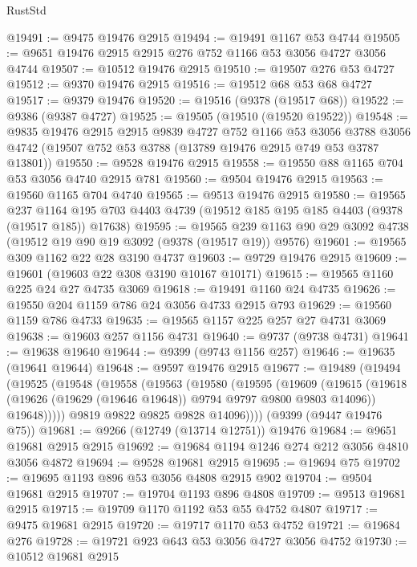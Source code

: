 \begin{lexlean}{RustStd}
\begin{coremodule}
@19491 := @9475 @19476 @2915
@19494 := @19491 @1167 @53 @4744
@19505 := @9651 @19476 @2915 @2915 @276 @752 @1166 @53 @3056 @4727 @3056 @4744
@19507 := @10512 @19476 @2915
@19510 := @19507 @276 @53 @4727
@19512 := @9370 @19476 @2915
@19516 := @19512 @68 @53 @68 @4727
@19517 := @9379 @19476
@19520 := @19516 (@9378 (@19517 @68))
@19522 := @9386 (@9387 @4727)
@19525 := @19505 (@19510 (@19520 @19522))
@19548 := @9835
    @19476
    @2915
    @2915
    @9839
    @4727
    @752
    @1166
    @53
    @3056
    @3788
    @3056
    @4742
    (@19507 @752 @53 @3788 (@13789 @19476 @2915 @749 @53 @3787 @13801))
@19550 := @9528 @19476 @2915
@19558 := @19550 @88 @1165 @704 @53 @3056 @4740 @2915 @781
@19560 := @9504 @19476 @2915
@19563 := @19560 @1165 @704 @4740
@19565 := @9513 @19476 @2915
@19580 := @19565
    @237
    @1164
    @195
    @703
    @4403
    @4739
    (@19512 @185 @195 @185 @4403 (@9378 (@19517 @185)) @17638)
@19595 := @19565
    @239
    @1163
    @90
    @29
    @3092
    @4738
    (@19512 @19 @90 @19 @3092 (@9378 (@19517 @19)) @9576)
@19601 := @19565 @309 @1162 @22 @28 @3190 @4737
@19603 := @9729 @19476 @2915
@19609 := @19601 (@19603 @22 @308 @3190 @10167 @10171)
@19615 := @19565 @1160 @225 @24 @27 @4735 @3069
@19618 := @19491 @1160 @24 @4735
@19626 := @19550 @204 @1159 @786 @24 @3056 @4733 @2915 @793
@19629 := @19560 @1159 @786 @4733
@19635 := @19565 @1157 @225 @257 @27 @4731 @3069
@19638 := @19603 @257 @1156 @4731
@19640 := @9737 (@9738 @4731)
@19641 := @19638 @19640
@19644 := @9399 (@9743 @1156 @257)
@19646 := @19635 (@19641 @19644)
@19648 := @9597 @19476 @2915
@19677 := @19489
    (@19494
      (@19525
        (@19548
          (@19558
            (@19563
              (@19580
                (@19595
                  (@19609
                    (@19615
                      (@19618 (@19626 (@19629 (@19646 @19648)) @9794 @9797 @9800 @9803 @14096))
                      @19648)))))
            @9819
            @9822
            @9825
            @9828
            @14096))))
    (@9399 (@9447 @19476 @75))
@19681 := @9266 (@12749 (@13714 @12751)) @19476
@19684 := @9651 @19681 @2915 @2915
@19692 := @19684 @1194 @1246 @274 @212 @3056 @4810 @3056 @4872
@19694 := @9528 @19681 @2915
@19695 := @19694 @75
@19702 := @19695 @1193 @896 @53 @3056 @4808 @2915 @902
@19704 := @9504 @19681 @2915
@19707 := @19704 @1193 @896 @4808
@19709 := @9513 @19681 @2915
@19715 := @19709 @1170 @1192 @53 @55 @4752 @4807
@19717 := @9475 @19681 @2915
@19720 := @19717 @1170 @53 @4752
@19721 := @19684 @276
@19728 := @19721 @923 @643 @53 @3056 @4727 @3056 @4752
@19730 := @10512 @19681 @2915

\end{coremodule}
\end{lexlean}

